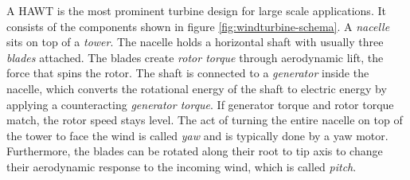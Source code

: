 A \acf{HAWT} is the most prominent turbine design for large scale applications\cite[Chapter 1.1]{burtonWindEnergyHandbook2011}. It consists of the components shown in figure \ref{fig:windturbine-schema}. A \textit{nacelle} sits on top of a \textit{tower}. The nacelle holds a horizontal shaft with usually three \textit{blades} attached. The blades create \textit{rotor torque} through aerodynamic lift, the force that spins the rotor. The shaft is connected to a \textit{generator} inside the nacelle, which converts the rotational energy of the shaft to electric energy by applying a counteracting \textit{generator torque}. If generator torque and rotor torque match, the rotor speed stays level. The act of turning the entire nacelle on top of the tower to face the wind is called \textit{yaw} and is typically done by a yaw motor. Furthermore, the blades can be rotated along their root to tip axis to change their aerodynamic response to the incoming wind, which is called \textit{pitch}.

